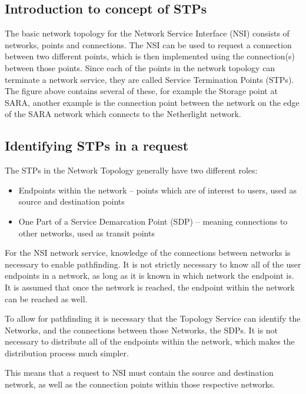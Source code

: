 \documentclass[12pt]{article}  %
\begin{document}
\subsection{Introduction to concept of STPs}

The basic network topology for the Network Service Interface (NSI) 
consists of networks, points and connections. The NSI can be used to request a 
connection between two different points, which is then implemented using the connection(s) 
between those points. Since each of the points in the network topology can terminate 
a network service, they are called Service Termination Points (STPs). The figure 
above contains several of these, for example the Storage point at SARA, another 
example is the connection point between the network on the edge of the SARA network 
which connects to the Netherlight network.


\subsection{Identifying STPs in a request}

The STPs in the Network Topology generally have two different 
roles:

\begin{itemize}
    \item  Endpoints within the network – points which are of interest to 
users, used as source and destination points

\item  One Part of a Service Demarcation Point (SDP) – meaning connections 
to other networks, used as transit points
\end{itemize}

For the NSI network service, knowledge of the connections between 
networks is necessary to enable pathfinding. It is not strictly necessary to know 
all of the user endpoints in a network, as long as it is known in which network 
the endpoint is. It is assumed that once the network is reached, the endpoint within 
the network can be reached as well.

To allow for pathfinding it is necessary that the Topology Service 
can identify the Networks, and the connections between those Networks, the SDPs. 
It is not necessary to distribute all of the endpoints within the network, which 
makes the distribution process much simpler.

This means that a request to NSI must contain the source and destination 
network, as well as the connection points within those respective networks.
\end{document}
